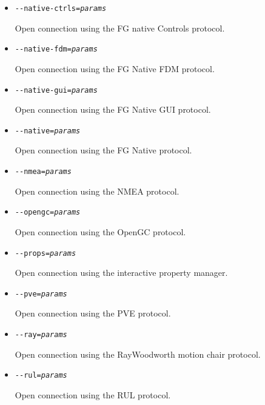 {\begin{itemize}
  \item{\texttt{-$ $-native-ctrls={\it params}}}

    Open connection using the FG native Controls protocol.

  \item{\texttt{-$ $-native-fdm={\it params}}}

    Open connection using the FG Native FDM protocol.

  \item{\texttt{-$ $-native-gui={\it params}}}

    Open connection using the FG Native GUI protocol.

  \item{\texttt{-$ $-native={\it params}}}

    Open connection using the FG Native protocol.

  \item{\texttt{-$ $-nmea={\it params}}}

    Open connection using the NMEA protocol.

  \item{\texttt{-$ $-opengc={\it params}}}

    Open connection using the OpenGC protocol.

  \item{\texttt{-$ $-props={\it params}}}

    Open connection using the interactive property manager.

  \item{\texttt{-$ $-pve={\it params}}}

    Open connection using the PVE protocol.

  \item{\texttt{-$ $-ray={\it params}}}

    Open connection using the RayWoodworth motion chair protocol.

  \item{\texttt{-$ $-rul={\it params}}}

    Open connection using the RUL protocol.

  \end{itemize}
}
\fi

